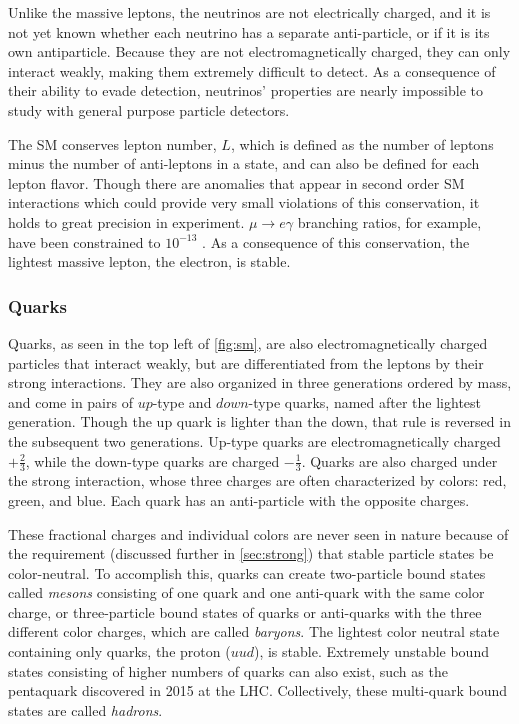 Unlike the massive leptons, the neutrinos are not electrically charged, and it is not yet known whether each neutrino has a separate anti-particle, or if it is its own antiparticle. Because they are not electromagnetically charged, they can only interact weakly, making them extremely difficult to detect. As a consequence of their ability to evade detection, neutrinos' properties are nearly impossible to study with general purpose particle detectors. 

The \ac{SM} conserves lepton number, $L$, which is defined as the number of leptons minus the number of anti-leptons in a state, and can also be defined for each lepton flavor. Though there are anomalies that appear in second order \ac{SM} interactions which could provide very small violations of this conservation, it holds to great precision in experiment. $\mu \rightarrow e\gamma$ branching ratios, for example, have been constrained to $10^{-13}$ \cite{1605.05081}. As a consequence of this conservation, the lightest massive lepton, the electron, is stable.

\subsubsection{Quarks}
\label{sec:quarks}

Quarks, as seen in the top left of \autoref{fig:sm}, are also electromagnetically charged particles that interact weakly, but are differentiated from the leptons by their strong interactions. They are also organized in three generations ordered by mass, and come in pairs of $up$-type and $down$-type quarks, named after the lightest generation. Though the up quark is lighter than the down, that rule is reversed in the subsequent two generations. Up-type quarks are electromagnetically charged $+\frac{2}{3}$, while the down-type quarks are charged $-\frac{1}{3}$. Quarks are also charged under the strong interaction, whose three charges are often characterized by colors: red, green, and blue. Each quark has an anti-particle with the opposite charges. 

These fractional charges and individual colors are never seen in nature because of the requirement (discussed further in \autoref{sec:strong}) that stable particle states be color-neutral. To accomplish this, quarks can create two-particle bound states called \textit{mesons} consisting of one quark and one anti-quark with the same color charge, or three-particle bound states of quarks or anti-quarks with the three different color charges, which are called \textit{baryons}. The lightest color neutral state containing only quarks, the proton ($uud$), is stable. Extremely unstable bound states consisting of higher numbers of quarks can also exist, such as the pentaquark discovered in 2015 at the \ac{LHC}. \cite{Pentaquark} Collectively, these multi-quark bound states are called \textit{hadrons}. 

